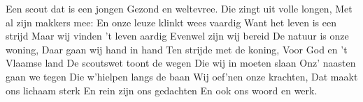 \beginverse
Een scout dat is een jongen
Gezond en weltevree.
Die zingt uit volle longen,
Met al zijn makkers mee:
\endverse
\beginchorus
En onze leuze klinkt wees vaardig
Want het leven is een strijd
Maar wij vinden ’t leven aardig 
Evenwel zijn wij bereid
\endchorus
\beginverse
De natuur is onze woning,
Daar gaan wij hand in hand
Ten strijde met de koning,
Voor God en ’t Vlaamse land
\endverse
\beginverse
De scoutswet toont de wegen
Die wij in moeten slaan
Onz’ naasten gaan we tegen
Die w’hielpen langs de baan
\endverse
\beginverse
Wij oef’nen onze krachten,
Dat maakt ons lichaam sterk
En rein zijn ons gedachten
En ook ons woord en werk.
\endverse
\endsong